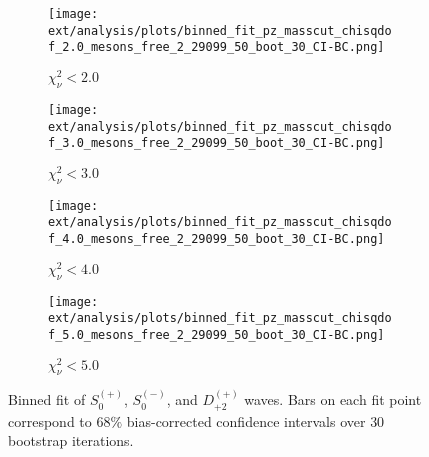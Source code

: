 \begin{figure}[htbp]
    \centering
    \begin{subfigure}{0.45\textwidth}
        \texttt{[image: ext/analysis/plots/binned\_fit\_pz\_masscut\_chisqdof\_2.0\_mesons\_free\_2\_29099\_50\_boot\_30\_CI-BC.png]}
        \caption{$\chi^2_\nu < 2.0$}
    \end{subfigure}
    \hfill
    \begin{subfigure}{0.45\textwidth}
        \texttt{[image: ext/analysis/plots/binned\_fit\_pz\_masscut\_chisqdof\_3.0\_mesons\_free\_2\_29099\_50\_boot\_30\_CI-BC.png]}
        \caption{$\chi^2_\nu < 3.0$}
    \end{subfigure}
    \vspace{1em}
    \begin{subfigure}{0.45\textwidth}
        \texttt{[image: ext/analysis/plots/binned\_fit\_pz\_masscut\_chisqdof\_4.0\_mesons\_free\_2\_29099\_50\_boot\_30\_CI-BC.png]}
        \caption{$\chi^2_\nu < 4.0$}
    \end{subfigure}
    \hfill
    \begin{subfigure}{0.45\textwidth}
        \texttt{[image: ext/analysis/plots/binned\_fit\_pz\_masscut\_chisqdof\_5.0\_mesons\_free\_2\_29099\_50\_boot\_30\_CI-BC.png]}
        \caption{$\chi^2_\nu < 5.0$}
    \end{subfigure}

    \caption{Binned fit of $S_{0}^{(+)}$, $S_{0}^{(-)}$, and $D_{+2}^{(+)}$ waves. Bars on each fit point correspond to $68\%$ bias-corrected confidence intervals over $ 30 $ bootstrap iterations.}
    \label{fig:binned-fit-all-Spn-D2p}
\end{figure}

